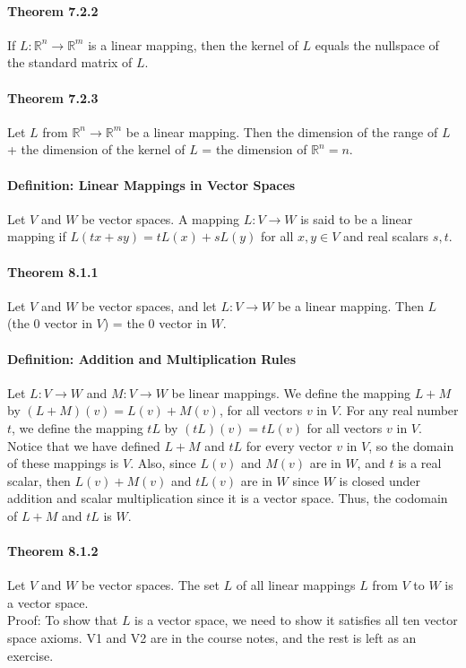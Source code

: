 \documentclass[10pt,letter]{article}
\begin{document}
\paragraph{Theorem 7.2.2} If $L:\mathbb{R}^n\rightarrow\mathbb{R}^m$ is a linear mapping, then the kernel of $L$ equals the nullspace of the standard matrix of $L$. 
\paragraph{Theorem 7.2.3} Let $L$ from $\mathbb{R}^n\rightarrow\mathbb{R}^m$ be a linear mapping. Then the dimension of the range of $L$ + the dimension of the kernel of $L$ = the dimension of $\mathbb{R}^n=n$. 

\paragraph{Definition: Linear Mappings in Vector Spaces} Let $V$ and $W$ be vector spaces. A mapping $L:V\rightarrow W$ is said to be a linear mapping if $L(tx+sy)=tL(x)+sL(y)$ for all $x,y\in V$ and real scalars $s,t$. 
\paragraph{Theorem 8.1.1} Let $V$ and $W$ be vector spaces, and let $L:V\rightarrow W$ be a linear mapping. Then $L$ (the 0 vector in $V$) = the $0$ vector in $W$. 
\paragraph{Definition: Addition and Multiplication Rules}Let $L:V\rightarrow W$ and $M:V\rightarrow W$ be linear mappings. We define the mapping $L+M$ by $(L+M)(v)=L(v)+M(v)$, for all vectors $v$ in $V$. For any real number $t$, we define the mapping $tL$ by $(tL)(v)=tL(v)$ for all vectors $v$ in $V$. Notice that we have defined $L + M$ and $tL$ for every vector $v$ in $V$, so the domain of these mappings is $V$. Also, since $L(v)$ and $M(v)$ are in $W$, and $t$ is a real scalar, then $L(v) + M(v)$ and $tL(v)$ are in $W$ since $W$ is closed under addition and scalar multiplication since it is a vector space. Thus, the codomain of $L + M$ and $tL$ is $W$.
\paragraph{Theorem 8.1.2} Let $V$ and $W$ be vector spaces. The set $L$ of all linear mappings $L$ from $V$ to $W$ is a vector space. \\ 
Proof: To show that $L$ is a vector space, we need to show it satisfies all ten vector space axioms. V1 and V2 are in the course notes, and the rest is left as an exercise. 
\end{document}
